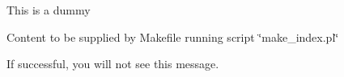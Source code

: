 This is a dummy

Content to be supplied by Makefile running script \char`\"{}make\_\-index.pl\char`\"{}

If successful, you will not see this message. 